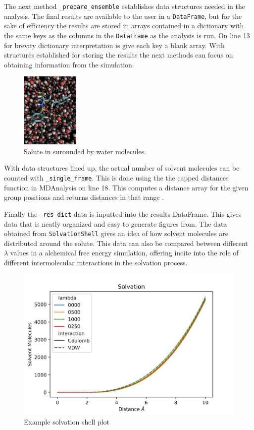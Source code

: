 \documentclass{article}[letterpaper, margins=1in, 12pt]
\begin{document}
The next method \lstinline{_prepare_ensemble} establishes data structures needed in the analysis. The final results are available to the user in a \texttt{DataFrame}, but for the sake of efficiency the results are stored in arrays contained in a dictionary with the same keys as the columns in the \texttt{DataFrame} as the analysis is run. On line 13 for brevity dictionary interpretation is give each key a blank array.  With structures established for storing the results the next methods can focus on obtaining information from the simulation.

\begin{figure}
	\centering
	\includegraphics[width=0.25\textwidth]{solvent}
	\caption{Solute in surounded by water molecules.}
	\label{fig:solute}
\end{figure}

With data structures lined up, the actual number of solvent molecules can be counted with \lstinline{_single_frame}. This is done using the the capped distances function in MDAnalysis on line 18. This computes a distance array for the given group positions and returns distances in that range \cite{michaud-agrawal_mdanalysis_2011, gowers_mdanalysis_2016}. 

Finally the \lstinline{_res_dict} data is inputted into the results DataFrame. This gives data that is neatly organized and easy to generate figures from. The data obtained from \texttt{SolvationShell} gives an idea of how solvent molecules are distributed around the solute. This data can also be compared between different $\lambda$ values in a alchemical free energy simulation, offering incite into the role of different intermolecular interactions in the solvation process.

\begin{figure}[h]
    \centering
	\includegraphics{solv_plot}
	\caption{Example solvation shell plot}
	\label{fig:solvation}
\end{figure}
 
\end{document}
